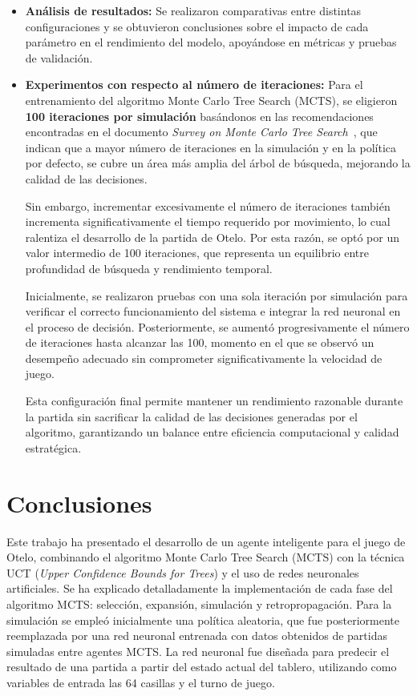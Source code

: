 \documentclass[conference,a4paper]{IEEEtran}
\begin{document}
\begin{itemize}
    \item \textbf{Análisis de resultados:}  
    Se realizaron comparativas entre distintas configuraciones y se obtuvieron conclusiones sobre el impacto de cada parámetro en el rendimiento del modelo, apoyándose en métricas y pruebas de validación.
    \item \textbf{Experimentos con respecto al número de iteraciones:} 
    Para el entrenamiento del algoritmo Monte Carlo Tree Search (MCTS), se eligieron \textbf{100 iteraciones por simulación} basándonos en las recomendaciones encontradas en el documento \textit{Survey on Monte Carlo Tree Search}~\cite{b3}, que indican que a mayor número de iteraciones en la simulación y en la política por defecto, se cubre un área más amplia del árbol de búsqueda, mejorando la calidad de las decisiones.

    Sin embargo, incrementar excesivamente el número de iteraciones también incrementa significativamente el tiempo requerido por movimiento, lo cual ralentiza el desarrollo de la partida de Otelo. Por esta razón, se optó por un valor intermedio de 100 iteraciones, que representa un equilibrio entre profundidad de búsqueda y rendimiento temporal.

    Inicialmente, se realizaron pruebas con una sola iteración por simulación para verificar el correcto funcionamiento del sistema e integrar la red neuronal en el proceso de decisión. Posteriormente, se aumentó progresivamente el número de iteraciones hasta alcanzar las 100, momento en el que se observó un desempeño adecuado sin comprometer significativamente la velocidad de juego.

    Esta configuración final permite mantener un rendimiento razonable durante la partida sin sacrificar la calidad de las decisiones generadas por el algoritmo, garantizando un balance entre eficiencia computacional y calidad estratégica.

  \end{itemize}


\section{Conclusiones}

Este trabajo ha presentado el desarrollo de un agente inteligente para el juego de Otelo, combinando el algoritmo Monte Carlo Tree Search (MCTS) con la técnica UCT (\textit{Upper Confidence Bounds for Trees}) y el uso de redes neuronales artificiales. Se ha explicado detalladamente la implementación de cada fase del algoritmo MCTS: selección, expansión, simulación y retropropagación. Para la simulación se empleó inicialmente una política aleatoria, que fue posteriormente reemplazada por una red neuronal entrenada con datos obtenidos de partidas simuladas entre agentes MCTS. La red neuronal fue diseñada para predecir el resultado de una partida a partir del estado actual del tablero, utilizando como variables de entrada las 64 casillas y el turno de juego. 
\end{document}
